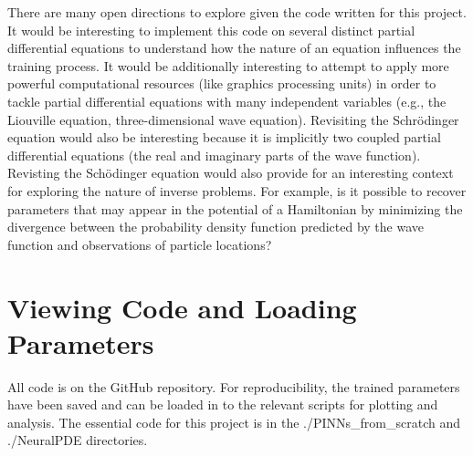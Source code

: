 \documentclass[11pt]{article}
\newcommand{\1}{\mathbf 1}
\begin{document}
There are many open directions to explore given the code written for this project.
It would be interesting to implement this code on several distinct partial differential equations to understand how the nature of an equation influences the training process.
It would be additionally interesting to attempt to apply more powerful computational resources (like graphics processing units) in order to tackle partial differential equations with many independent variables (e.g., the Liouville equation, three-dimensional wave equation).
Revisiting the Schr\"odinger equation would also be interesting because it is implicitly two coupled partial differential equations (the real and imaginary parts of the wave function).
Revisting the Sch\"odinger equation would also provide for an interesting context for exploring the nature of inverse problems.
For example, is it possible to recover parameters that may appear in the potential of a Hamiltonian by minimizing the divergence between the probability density function predicted by the wave function and observations of particle locations?

\appendix
\section{Viewing Code and Loading Parameters}

All code is on the GitHub repository.
For reproducibility, the trained parameters have been saved and can be loaded in to the relevant scripts for plotting and analysis.
The essential code for this project is in the ./PINNs\_from\_scratch and ./NeuralPDE directories.
\end{document}
